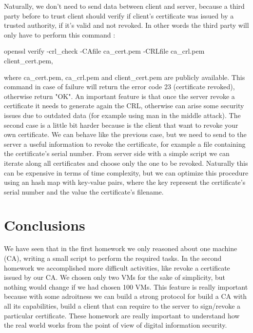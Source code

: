 \documentclass[11pt]{article}
\begin{document}
Naturally, we don't need to send data between client and server, because a third party before to trust client should verify if client's certificate was issued by a trusted authority, if it's valid and not revoked. In other words the third party will only have to perform this command :
\begin{center}
openssl verify -crl\_check -CAfile ca\_cert.pem -CRLfile ca\_crl.pem client\_cert.pem,
\end{center}
where ca\_cert.pem, ca\_crl.pem and client\_cert.pem are publicly available. This command in case of failure will return the error code 23 (certificate revoked), otherwise return "OK". An important feature is that once the server revoke a certificate it needs to generate again the CRL, otherwise can arise some security issues due to outdated data (for example using man in the middle attack). The second case is a little bit harder because is the client that want to revoke your own certificate. We can behave like the previous case, but we need to send to the server a useful information to revoke the certificate, for example a file containing the certificate's serial number. From server side with a simple script we can iterate along all certificates and choose only the one to be revoked. Naturally this can be expensive in terms of time complexity, but we can optimize this procedure using an hash map with key-value pairs, where the key represent the certificate's serial number and the value the certificate's filename.
\section{Conclusions}
We have seen that in the first homework we only reasoned about one machine (CA), writing a small script to perform the required tasks. In the second homework we accomplished more difficult activities, like revoke a certificate issued by our CA. We chosen only two VMs for the sake of simplicity, but nothing would change if we had chosen 100 VMs. This feature is really important because with some adroitness we can build a strong protocol for build a CA with all its capabilities, build a client that can require to the server to sign/revoke a particular certificate. These homework are really important to understand how the real world works from the point of view of digital information security.
\end{document}
